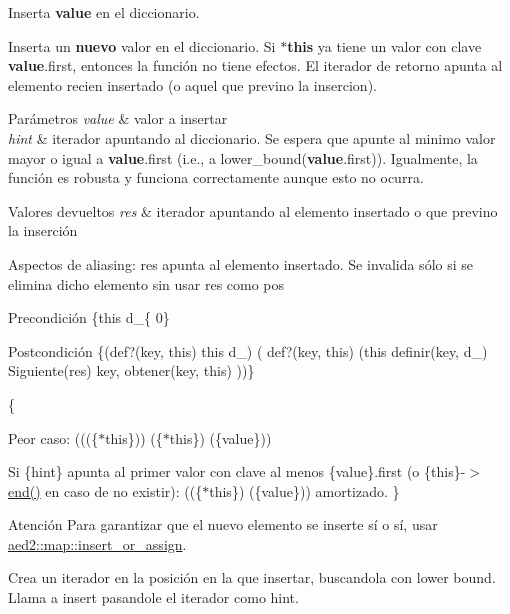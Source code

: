 Inserta {\bfseries value} en el diccionario. 

Inserta un {\bfseries nuevo} valor en el diccionario. Si {\bfseries $\ast$this} ya tiene un valor con clave {\bfseries value}.first, entonces la función no tiene efectos. El iterador de retorno apunta al elemento recien insertado (o aquel que previno la insercion).


\begin{DoxyParams}{Parámetros}
{\em value} & valor a insertar \\
\hline
{\em hint} & iterador apuntando al diccionario. Se espera que apunte al minimo valor mayor o igual a {\bfseries value}.first (i.\+e., a lower\+\_\+bound({\bfseries value}.first)). Igualmente, la función es robusta y funciona correctamente aunque esto no ocurra. \\
\hline
\end{DoxyParams}

\begin{DoxyRetVals}{Valores devueltos}
{\em res} & iterador apuntando al elemento insertado o que previno la inserción\\
\hline
\end{DoxyRetVals}
\begin{DoxyParagraph}{Aspectos de aliasing\+:}
res apunta al elemento insertado. Se invalida sólo si se elimina dicho elemento sin usar res como pos
\end{DoxyParagraph}
\begin{DoxyPrecond}{Precondición}
\{this  d\+\_\+\{ 0\} 
\end{DoxyPrecond}
\begin{DoxyPostcond}{Postcondición}
\{(def?(key, this)  this  d\+\_)  ( def?(key, this)  (this  definir(key, d\+\_)  Siguiente(res)   key, obtener(key, this)  ))\}
\end{DoxyPostcond}
\{
\begin{DoxyItemize}
\item Peor caso\+: (((\{$\ast$this\}))  (\{$\ast$this\})  (\{value\}))
\item Si \{hint\} apunta al primer valor con clave al menos \{value\}.first (o \{this\}-\/$>$\hyperlink{classaed2_1_1map_a76023e6a56cb625513e1b5ea028bf983_a76023e6a56cb625513e1b5ea028bf983}{end()} en caso de no existir)\+: ((\{$\ast$this\})  (\{value\})) amortizado. \}
\end{DoxyItemize}

\begin{DoxyAttention}{Atención}
Para garantizar que el nuevo elemento se inserte sí o sí, usar \hyperlink{classaed2_1_1map_a2ef6723c183916276b0afc4a4c721475_a2ef6723c183916276b0afc4a4c721475}{aed2\+::map\+::insert\+\_\+or\+\_\+assign}.
\end{DoxyAttention}
Crea un iterador en la posición en la que insertar, buscandola con lower bound. Llama a insert pasandole el iterador como hint. 

